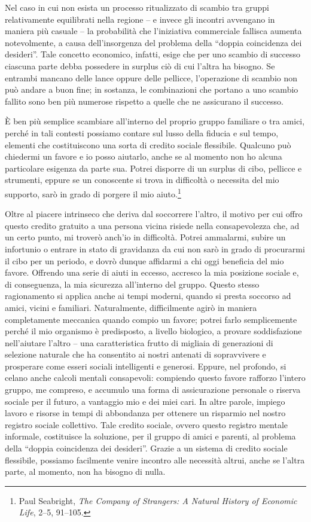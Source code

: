 \documentclass[
  a5paper,
  smalldemyvopaper,10pt,twoside,onecolumn,openright,extrafontsizes,hidelinks]{memoir}
\begin{document}
Nel caso in cui non esista un processo ritualizzato di scambio tra
gruppi relativamente equilibrati nella regione -- e invece gli incontri
avvengano in maniera più casuale -- la probabilità che l'iniziativa
commerciale fallisca aumenta notevolmente, a causa dell'insorgenza del
problema della ``doppia coincidenza dei desideri''. Tale concetto
economico, infatti, esige che per uno scambio di successo ciascuna parte
debba possedere in surplus ciò di cui l'altra ha bisogno. Se entrambi
mancano delle lance oppure delle pellicce, l'operazione di scambio non
può andare a buon fine; in sostanza, le combinazioni che portano a uno
scambio fallito sono ben più numerose rispetto a quelle che ne
assicurano il successo.

È ben più semplice scambiare all'interno del proprio gruppo familiare o
tra amici, perché in tali contesti possiamo contare sul lusso della
fiducia e sul tempo, elementi che costituiscono una sorta di credito
sociale flessibile. Qualcuno può chiedermi un favore e io posso
aiutarlo, anche se al momento non ho alcuna particolare esigenza da
parte sua. Potrei disporre di un surplus di cibo, pellicce e strumenti,
eppure se un conoscente si trova in difficoltà o necessita del mio
supporto, sarò in grado di porgere il mio aiuto.\footnote{Paul
  Seabright, \emph{The Company of Strangers: A Natural History of
  Economic Life}, 2--5, 91--105.}

Oltre al piacere intrinseco che deriva dal soccorrere l'altro, il motivo
per cui offro questo credito gratuito a una persona vicina risiede nella
consapevolezza che, ad un certo punto, mi troverò anch'io in difficoltà.
Potrei ammalarmi, subire un infortunio o entrare in stato di gravidanza
da cui non sarò in grado di procurarmi il cibo per un periodo, e dovrò
dunque affidarmi a chi oggi beneficia del mio favore. Offrendo una serie
di aiuti in eccesso, accresco la mia posizione sociale e, di
conseguenza, la mia sicurezza all'interno del gruppo. Questo stesso
ragionamento si applica anche ai tempi moderni, quando si presta
soccorso ad amici, vicini e familiari. Naturalmente, difficilmente agirò
in maniera completamente meccanica quando compio un favore; potrei farlo
semplicemente perché il mio organismo è predisposto, a livello
biologico, a provare soddisfazione nell'aiutare l'altro -- una
caratteristica frutto di migliaia di generazioni di selezione naturale
che ha consentito ai nostri antenati di sopravvivere e prosperare come
esseri sociali intelligenti e generosi. Eppure, nel profondo, si celano
anche calcoli mentali consapevoli: compiendo questo favore rafforzo
l'intero gruppo, me compreso, e accumulo una forma di assicurazione
personale o riserva sociale per il futuro, a vantaggio mio e dei miei
cari. In altre parole, impiego lavoro e risorse in tempi di abbondanza
per ottenere un risparmio nel nostro registro sociale collettivo. Tale
credito sociale, ovvero questo registro mentale informale, costituisce
la soluzione, per il gruppo di amici e parenti, al problema della
``doppia coincidenza dei desideri''. Grazie a un sistema di credito
sociale flessibile, possiamo facilmente venire incontro alle necessità
altrui, anche se l'altra parte, al momento, non ha bisogno di nulla.
\end{document}
